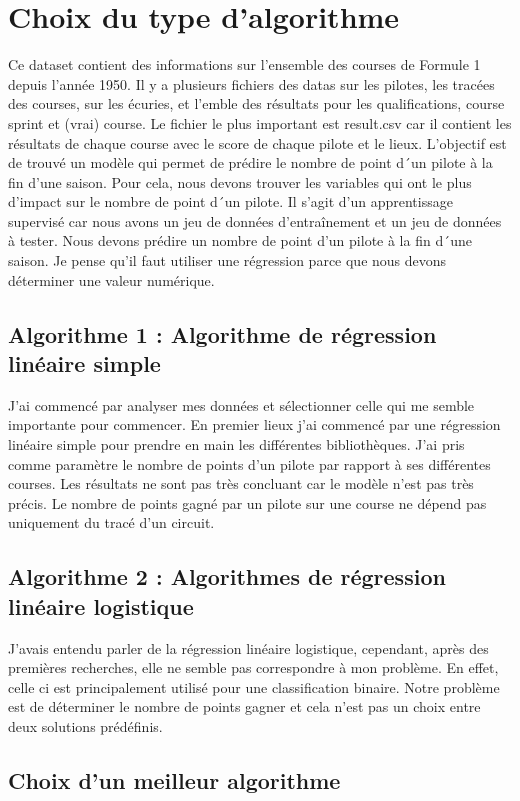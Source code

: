\chapter{Choix du type d'algorithme}
Ce dataset contient des informations sur l'ensemble des courses de Formule 1 depuis l'année 1950. Il y a plusieurs fichiers des datas sur les pilotes, les tracées des courses, sur les écuries, et l'emble des résultats pour les qualifications, course sprint et (vrai) course. Le fichier le plus important est result.csv car il contient les résultats de chaque course avec le score de chaque pilote et le lieux. L'objectif est de trouvé un modèle qui permet de prédire le nombre de point d´un pilote à la fin d'une saison. Pour cela, nous devons trouver les variables qui ont le plus d'impact sur le nombre de point d´un pilote. Il s'agit d'un apprentissage supervisé car nous avons un jeu de données d'entraînement et un jeu de données à tester. Nous devons prédire un nombre de point d'un pilote à la fin d´une saison. Je pense qu'il faut utiliser une régression parce que nous devons déterminer une valeur numérique.

\section{Algorithme 1 : Algorithme de régression linéaire simple}
J'ai commencé par analyser mes données et sélectionner celle qui me semble importante pour commencer. En premier lieux j'ai commencé par une régression linéaire simple pour prendre en main les différentes bibliothèques. J'ai pris comme paramètre le nombre de points d'un pilote par rapport à ses différentes courses. Les résultats ne sont pas très concluant car le modèle n'est pas très précis. Le nombre de points gagné par un pilote sur une course ne dépend pas uniquement du tracé d'un circuit.

\section{Algorithme 2 : Algorithmes de régression linéaire logistique}
J'avais entendu parler de la régression linéaire logistique, cependant, après des premières recherches, elle ne semble pas correspondre à mon problème. En effet, celle ci est principalement utilisé pour une classification binaire. Notre problème est de déterminer le nombre de points gagner et cela n'est pas un choix entre deux solutions prédéfinis.

\newpage
\section{Choix d'un meilleur algorithme}

